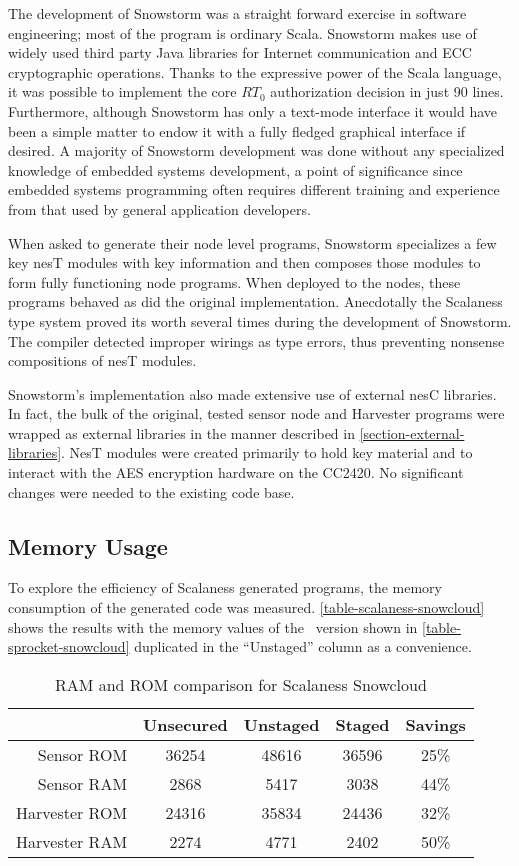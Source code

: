 The development of Snowstorm was a straight forward exercise in software engineering; most of
the program is ordinary Scala. Snowstorm makes use of widely used third party Java libraries for
Internet communication and ECC cryptographic operations. Thanks to the expressive power of the
Scala language, it was possible to implement the core $RT_0$ authorization decision in just 90
lines. Furthermore, although Snowstorm has only a text-mode interface it would have been a
simple matter to endow it with a fully fledged graphical interface if desired. A majority of
Snowstorm development was done without any specialized knowledge of embedded systems
development, a point of significance since embedded systems programming often requires different
training and experience from that used by general application developers.

When asked to generate their node level programs, Snowstorm specializes a few key nesT modules
with key information and then composes those modules to form  fully functioning node programs.
When deployed to the nodes, these programs behaved as did the original implementation.
Anecdotally the Scalaness type system proved its worth several times during the development of
Snowstorm. The compiler detected improper wirings as type errors, thus preventing nonsense
compositions of nesT modules. 

Snowstorm's implementation also made extensive use of external nesC libraries. In fact, the bulk
of the original, tested sensor node and Harvester programs were wrapped as external libraries in
the manner described in \autoref{section-external-libraries}. NesT modules were created
primarily to hold key material and to interact with the AES encryption hardware on the CC2420.
No significant changes were needed to the existing code base.

\subsection{Memory Usage}

To explore the efficiency of Scalaness generated programs, the memory consumption of the
generated code was measured. \autoref{table-scalaness-snowcloud} shows the results with the
memory values of the \Sprocket\ version shown in \autoref{table-sprocket-snowcloud} duplicated
in the ``Unstaged'' column as a convenience.

\begin{table}[h]
\centering \newcommand\T{\rule{0pt}{2.1ex}}
\caption{RAM and ROM comparison for Scalaness Snowcloud} {
\begin{tabular}{|r||c|c|c|c|} \hline \hline
              & Unsecured & Unstaged & Staged & Savings\\ \hline
Sensor ROM    &     36254 &    48616 &  36596 & 25\% \\
Sensor RAM    &      2868 &     5417 &   3038 & 44\% \\ \hline
Harvester ROM &     24316 &    35834 &  24436 & 32\% \\
Harvester RAM &      2274 &     4771 &   2402 & 50\% \\ \hline
\end{tabular}
}
\label{table-scalaness-snowcloud}
\end{table}

